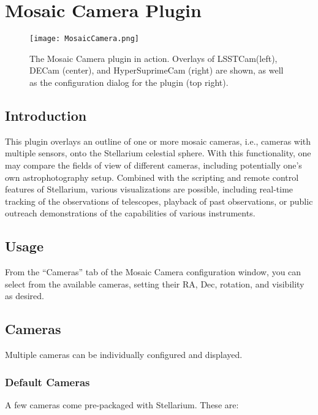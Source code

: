 \newpage
\section{Mosaic Camera Plugin}
\label{sec:plugins:MosaicCamera}

\begin{figure}[t]\centering
\texttt{[image: MosaicCamera.png]}
\caption{The Mosaic Camera plugin in action.  Overlays of LSSTCam(left), DECam (center), and HyperSuprimeCam (right) are shown, as well as the configuration dialog for the plugin (top right).}
\label{fig:plugins:MosaicCamera}
\end{figure}

\subsection{Introduction}
\label{sec:plugins:MosaicCamera:intro}
This plugin overlays an outline of one or more mosaic cameras, i.e., cameras with multiple sensors, onto the Stellarium celestial sphere.
With this functionality, one may compare the fields of view of different cameras, including potentially one's own astrophotography setup.
Combined with the scripting and remote control features of Stellarium, various visualizations are possible, including real-time tracking of the observations of telescopes, playback of past observations, or public outreach demonstrations of the capabilities of various instruments.

\subsection{Usage}
\label{sec:plugins:MosaicCamera:usage}

From the ``Cameras'' tab of the Mosaic Camera configuration window, you can select from the available cameras, setting their RA, Dec, rotation, and visibility as desired.

\subsection{Cameras}
\label{sec:plugins:MosaicCamera:cameras}
Multiple cameras can be individually configured and displayed.

\subsubsection{Default Cameras}
\label{sec:plugins:MosaicCamera:cameras:default}
A few cameras come pre-packaged with Stellarium.  These are:

